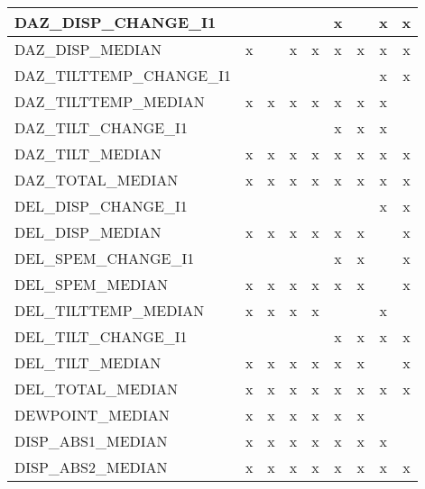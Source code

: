 \begin{longtable}{|lcccccccc|}
    DAZ\_DISP\_CHANGE\_I1 &        &        &        &        &      x &        &      x &      x \\ \hline
    DAZ\_DISP\_MEDIAN &      x &        &      x &      x &      x &      x &      x &      x \\ \hline
    DAZ\_TILTTEMP\_CHANGE\_I1 &        &        &        &        &        &        &      x &      x \\ \hline
    DAZ\_TILTTEMP\_MEDIAN &      x &      x &      x &      x &      x &      x &      x &        \\ \hline
    DAZ\_TILT\_CHANGE\_I1 &        &        &        &        &      x &      x &      x &        \\ \hline
    DAZ\_TILT\_MEDIAN &      x &      x &      x &      x &      x &      x &      x &      x \\ \hline
    DAZ\_TOTAL\_MEDIAN &      x &      x &      x &      x &      x &      x &      x &      x \\ \hline
    DEL\_DISP\_CHANGE\_I1 &        &        &        &        &        &        &      x &      x \\ \hline
    DEL\_DISP\_MEDIAN &      x &      x &      x &      x &      x &      x &        &      x \\ \hline
    DEL\_SPEM\_CHANGE\_I1 &        &        &        &        &      x &      x &        &      x \\ \hline
    DEL\_SPEM\_MEDIAN &      x &      x &      x &      x &      x &      x &        &      x \\ \hline
    DEL\_TILTTEMP\_MEDIAN &      x &      x &      x &      x &        &        &      x &        \\ \hline
    DEL\_TILT\_CHANGE\_I1 &        &        &        &        &      x &      x &      x &      x \\ \hline
    DEL\_TILT\_MEDIAN &      x &      x &      x &      x &      x &      x &        &      x \\ \hline
    DEL\_TOTAL\_MEDIAN &      x &      x &      x &      x &      x &      x &      x &      x \\ \hline
    DEWPOINT\_MEDIAN &      x &      x &      x &      x &      x &      x &        &        \\ \hline
    DISP\_ABS1\_MEDIAN &      x &      x &      x &      x &      x &      x &      x &        \\ \hline
    DISP\_ABS2\_MEDIAN &      x &      x &      x &      x &      x &      x &      x &      x \\ \hline

\end{longtable}

